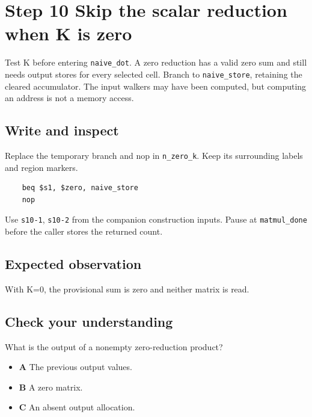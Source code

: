 \section{Step 10 Skip the scalar reduction when K is zero}\label{matmul-s10}

Test K before entering \texttt{naive\_dot}. A zero reduction has a valid zero sum and still needs output stores for every selected cell. Branch to \texttt{naive\_store}, retaining the cleared accumulator. The input walkers may have been computed, but computing an address is not a memory access.

\subsection{Write and inspect}
Replace the temporary branch and nop in \texttt{n\_zero\_k}. Keep its surrounding labels and region markers.

\begin{verbatim}
    beq $s1, $zero, naive_store
    nop
\end{verbatim}
Use \texttt{s10-1}, \texttt{s10-2} from the companion construction inputs. Pause at \texttt{matmul\_done} before the caller stores the returned count.

\subsection{Expected observation}
With K=0, the provisional sum is zero and neither matrix is read.

\subsection{Check your understanding}
What is the output of a nonempty zero-reduction product?

\begin{itemize}
  \item \textbf{A} The previous output values.
  \item \textbf{B} A zero matrix.
  \item \textbf{C} An absent output allocation.
\end{itemize}
